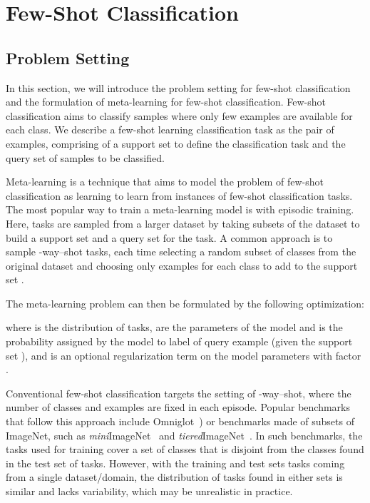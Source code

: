 \documentclass{article}
\begin{document}
\section{Few-Shot Classification}

\subsection{Problem Setting} 
In this section, we will introduce the problem setting for few-shot classification and the formulation of meta-learning for few-shot classification. Few-shot classification aims to classify samples where only few examples are available for each class. We describe a few-shot learning classification task
as the pair of examples, comprising of a support set  to define the classification task and the query set  of samples to be classified.



Meta-learning is a technique that aims to model the problem of few-shot classification as learning to learn from instances of few-shot classification tasks. The most popular way to train a meta-learning model is with episodic training. Here, tasks  are sampled from a larger dataset by taking subsets of the dataset to build a support set  and a query set  for the task. A common approach is to sample -way--shot tasks, each time selecting a random subset of  classes from the original dataset and choosing only  examples for each class to add to the support set .

The meta-learning problem can then be formulated by the following optimization:

where  is the distribution of tasks,  are the parameters of the model and  is the probability assigned by the model to label  of query example  (given the support set ), and  is an optional regularization term on the model parameters with factor .


Conventional few-shot classification targets the setting of -way--shot, where the number of classes and examples are fixed in each episode. Popular benchmarks that follow this approach include Omniglot~\cite{lake2015human}) or benchmarks made of subsets of ImageNet, such as \textit{mini}ImageNet~\cite{vinyals2016matching} and \textit{tiered}ImageNet~\cite{ren2018meta}. In such benchmarks, the tasks used for training cover a set of classes that is disjoint from the classes found in the test set of tasks. However, with the training and test sets tasks coming from a single dataset/domain, the distribution of tasks found in either sets is similar and lacks variability, which may be unrealistic in practice.
\end{document}

